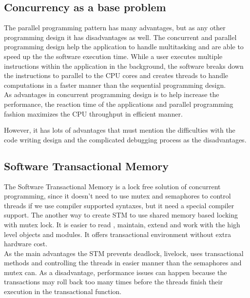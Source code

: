 \documentclass[12pt]{article}
\begin{document}
{\subsection{Concurrency as a base problem}
The parallel programming pattern has many advantages, but as any other programming design it has disadvantages as well. The concurrent and parallel programming design help the application to handle multitasking and are able to speed up the the software execution time. While a user executes multiple instructions within the application in the background, the software breaks down the instructions to parallel to the CPU cores and creates threads to handle computations in a faster manner than the sequential programming design.\\ 

As advantages in concurrent programming design  is to help increase the performance, the reaction time of the applications and parallel programming fashion maximizes the CPU throughput in efficient manner. 

However, it has lots of advantages that must mention the difficulties with the code writing design and the complicated debugging process as the disadvantages.   

\subsection{Software Transactional Memory}
The Software Transactional Memory is a lock free solution of concurrent programming, since it doesn't need to use mutex and semaphores to control threads if we use compiler supported syntaxes, but it need a special compiler support. The another way to create STM to use shared memory based locking with mutex lock. It is easier to read , maintain, extend and work with the high level objects and modules. It offers transactional environment without extra hardware cost.\\ 

As the main advantages the STM prevents deadlock, livelock, uses transactional methods and controlling the threads in easier manner than the semaphores and mutex can. As a disadvantage, performance issues can happen because the transactions may roll back too many times before the threads finish their execution in the transactional function.\\

}
\end{document}
